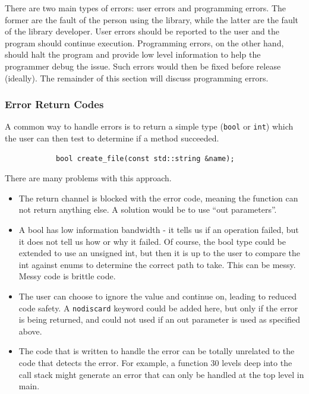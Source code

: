 \documentclass[12pt]{report}
\theoremstyle{definition}
\begin{document}
        There are two main types of errors: user errors and programming errors.
        The former are the fault of the person using the library, while the
        latter are the fault of the library developer. User errors should be
        reported to the user and the program should continue execution.
        Programming errors, on the other hand, should halt the program and
        provide low level information to help the programmer debug the
        issue. Such errors would then be fixed before release (ideally). The
        remainder of this section will discuss programming errors. \\

        \subsubsection{Error Return Codes}

          A common way to handle errors is to return a simple type (\texttt{bool} or \texttt{int})
          which the user can then test to determine if a method succeeded.

          \vspace{5mm}
          \begin{lstlisting}
            bool create_file(const std::string &name);
          \end{lstlisting}
          \vspace{5mm}

          There are many problems with this approach.

          \begin{itemize}
            \item The return channel is blocked with the error code, meaning
              the function can not return anything else. A solution would be to
              use ``out parameters''.
            \item A bool has low information bandwidth - it tells us if an
              operation failed, but it does not tell us how or why it failed.
              Of course, the bool type could be extended to use an unsigned int,
              but then it is up to the user to compare the int against enums to
              determine the correct path to take. This can be messy. Messy code
              is brittle code.
            \item The user can choose to ignore the value and continue on,
              leading to reduced code safety. A \texttt{nodiscard} keyword could be
              added here, but only if the error is being returned, and could not used
              if an out parameter is used as specified above.
            \item The code that is written to handle the error can be totally
              unrelated to the code that detects the error. For example, a
              function 30 levels deep into the call stack might generate an
              error that can only be handled at the top level in main.
          \end{itemize}
\end{document}
